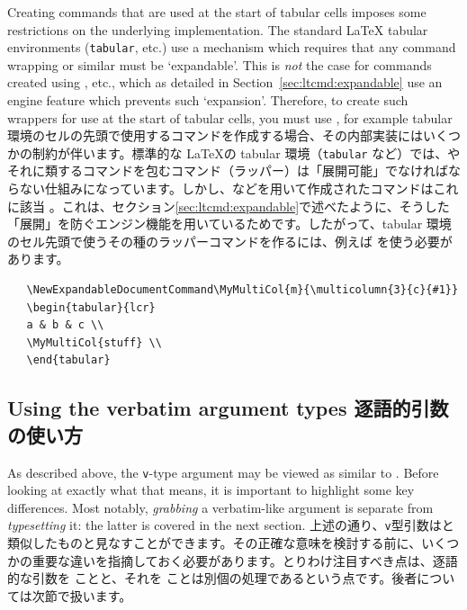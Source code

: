 \documentclass{ltxguide}
\newcommand\jpnewline{\vspace{3pt}\newline}
\DeclareRobustCommand{\jpemph}[1]{%
  \underLine{#1}%
}
\begin{document}
Creating commands that are used at the start of tabular cells imposes
some restrictions on the underlying implementation. The standard \LaTeX{}
tabular environments (\texttt{tabular}, etc.)  use a mechanism which requires
that any command wrapping  or similar must be
`expandable'. This is \emph{not} the case for commands created using
, etc., which as detailed in
Section~\ref{sec:ltcmd:expandable} use an engine feature which prevents
such `expansion'. Therefore, to create such wrappers for use at the start
of tabular cells, you must use , for example
\jpnewline
tabular環境のセルの先頭で使用するコマンドを作成する場合、その内部実装にはいくつかの制約が伴います。標準的な \LaTeX{}の tabular 環境（\texttt{tabular} など）では、やそれに類するコマンドを包むコマンド（ラッパー）は「展開可能」でなければならない仕組みになっています。しかし、などを用いて作成されたコマンドはこれに該当\jpemph{しません}。これは、セクション\ref{sec:ltcmd:expandable}で述べたように、そうした「展開」を防ぐエンジン機能を用いているためです。したがって、tabular 環境のセル先頭で使うその種のラッパーコマンドを作るには、例えば を使う必要があります。
\begin{verbatim}
   \NewExpandableDocumentCommand\MyMultiCol{m}{\multicolumn{3}{c}{#1}}
   \begin{tabular}{lcr}
   a & b & c \\
   \MyMultiCol{stuff} \\
   \end{tabular}
\end{verbatim}

\subsection{Using the verbatim argument types
 逐語的引数の使い方}\label{逐語的引数}

As described above, the \texttt{v}-type argument may be viewed as similar to
. Before looking at exactly what that means, it is important to
highlight some key differences. Most notably, \emph{grabbing} a verbatim-like
argument is separate from \emph{typesetting} it: the latter is covered in the
next section.
\jpnewline
上述の通り、\texttt{v}型引数はと類似したものと見なすことができます。その正確な意味を検討する前に、いくつかの重要な違いを指摘しておく必要があります。とりわけ注目すべき点は、逐語的な引数を\jpemph{取り込む（grabbing）}ことと、それを\jpemph{組版する}ことは別個の処理であるという点です。後者については次節で扱います。
\end{document}
